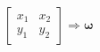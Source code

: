 \documentclass[preview]{standalone}
\begin{document}
\begin{align*}
\begin{bmatrix} x_1 & x_2 \\ y_1 & y_2 \end{bmatrix} \Rightarrow \mathbf{\omega}
\end{align*}
\end{document}
